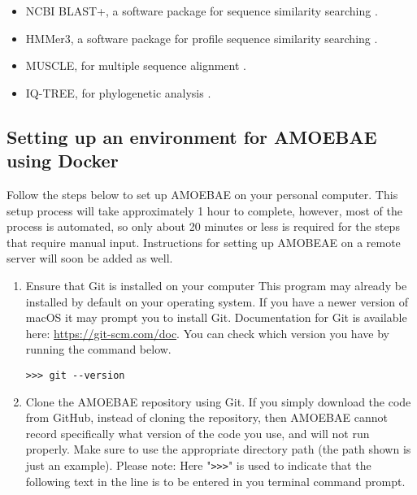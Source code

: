 \documentclass[12pt,letterpaper]{article}
\begin{document}
\begin{linenumbers}
\begin{itemize}
\item NCBI BLAST+, a software package for sequence similarity searching \citep{camacho2009}.

\item HMMer3, a software package for profile sequence similarity searching \citep{eddy1998}.

\item MUSCLE, for multiple sequence alignment \citep{edgar2004}.

\item IQ-TREE, for phylogenetic analysis \citep{nguyen2015}.


\end{itemize}


\subsection{Setting up an environment for AMOEBAE using Docker}
\label{setup_section}


Follow the steps below to set up AMOEBAE on your personal computer. This setup
process will take approximately 1 hour to complete, however, most of the
process is automated, so only about 20 minutes or less is required for the
steps that require manual input.  Instructions for setting up AMOBEAE on a
remote server will soon be added as well.

\begin{enumerate}

\item Ensure that Git is installed on your computer This program may already be
    installed by default on your operating system. If you have a newer version
        of macOS it may prompt you to install Git. Documentation for Git is
        available here: \url{https://git-scm.com/doc}. You can check which
        version you have by running the command below.

\begin{lstlisting}
>>> git --version
\end{lstlisting}

\item Clone the AMOEBAE repository using Git. If you simply download the code
    from GitHub, instead of cloning the repository, then AMOEBAE cannot record
        specifically what version of the code you use, and will not run
        properly. Make sure to use the appropriate directory path (the path
        shown is just an example).  Please note: Here "\texttt{>{}>{}>}" is
        used to indicate that the following text in the line is to be entered
        in you terminal command prompt.


\end{enumerate}
\end{linenumbers}
\end{document}
